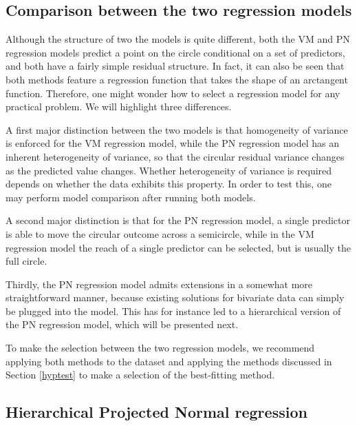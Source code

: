 \hypertarget{comparison-between-the-two-regression-models}{%
\subsection{Comparison between the two regression
models}\label{comparison-between-the-two-regression-models}}

Although the structure of two the models is quite different, both the VM
and PN regression models predict a point on the circle conditional on a
set of predictors, and both have a fairly simple residual structure. In
fact, it can also be seen that both methods feature a regression
function that takes the shape of an arctangent function. Therefore, one
might wonder how to select a regression model for any practical problem.
We will highlight three differences.

A first major distinction between the two models is that homogeneity of
variance is enforced for the VM regression model, while the PN
regression model has an inherent heterogeneity of variance, so that the
circular residual variance changes as the predicted value changes.
Whether heterogeneity of variance is required depends on whether the
data exhibits this property. In order to test this, one may perform
model comparison after running both models.

A second major distinction is that for the PN regression model, a single
predictor is able to move the circular outcome across a semicircle,
while in the VM regression model the reach of a single predictor can be
selected, but is usually the full circle.

Thirdly, the PN regression model admits extensions in a somewhat more
straightforward manner, because existing solutions for bivariate data
can simply be plugged into the model. This has for instance led to a
hierarchical version of the PN regression model, which will be presented
next.

To make the selection between the two regression models, we recommend
applying both methods to the dataset and applying the methods discussed
in Section \ref{hyptest} to make a selection of the best-fitting method.

\hypertarget{hierarchical-projected-normal-regression}{%
\subsection{Hierarchical Projected Normal
regression}\label{hierarchical-projected-normal-regression}}

